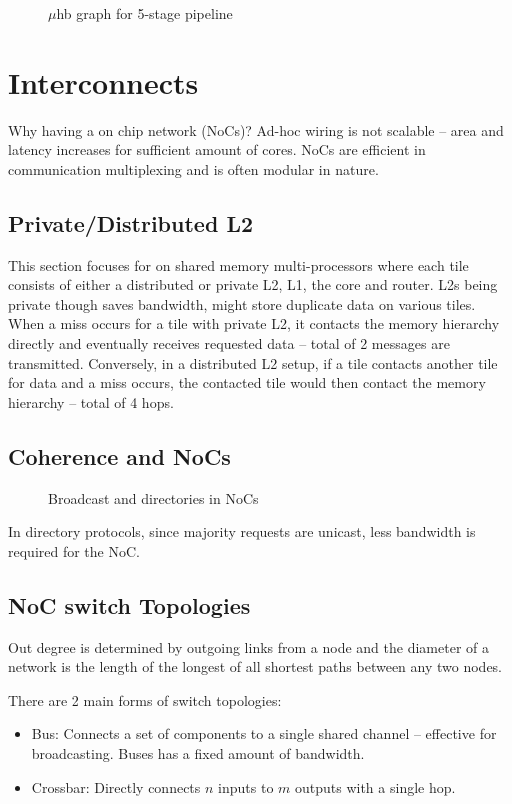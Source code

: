 \documentclass{article}
\begin{document}
\begin{multicols*}{2}
\begin{figure}[H]
  \caption{$\mu$hb graph for 5-stage pipeline}
\end{figure}

\section{Interconnects}
Why having a on chip network (NoCs)? Ad-hoc wiring is not scalable -- area and latency increases for sufficient amount of cores. NoCs are efficient in communication multiplexing and is often modular in nature.

\subsection{Private/Distributed L2}
This section focuses for on shared memory multi-processors where each tile consists of either a distributed or private L2, L1, the core and router. L2s being private though saves bandwidth, might store duplicate data on various tiles. When a miss occurs for a tile with private L2, it contacts the memory hierarchy directly and eventually receives requested data -- total of 2 messages are transmitted. Conversely, in a distributed L2 setup, if a tile contacts another tile for data and a miss occurs, the contacted tile would then contact the memory hierarchy -- total of 4 hops.

\subsection{Coherence and NoCs}
\begin{figure}[H]
  \caption{Broadcast and directories in NoCs}
\end{figure}

\noindent\newline
In directory protocols, since majority requests are unicast, less bandwidth is required for the NoC.

\subsection{NoC switch Topologies}
Out degree is determined by outgoing links from a node and the diameter of a network is the length of the longest of all shortest paths between any two nodes.

\noindent\newline
There are 2 main forms of switch topologies:
\begin{itemize}
    \item Bus: Connects a set of components to a single shared channel -- effective for broadcasting. Buses has a fixed amount of bandwidth.
    \item Crossbar: Directly connects $n$ inputs to $m$ outputs with a single hop.
\end{itemize}


\end{multicols*}
\end{document}
